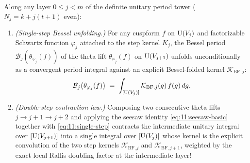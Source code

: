 \begin{proposition}
\label{prop:11:double-step}
Along any layer $0 \le j < m$ of the definite unitary period tower ($N_j = k + j(t+1)$ even):
\begin{enumerate}[label=\textup{(\roman*)}]
\item \emph{(Single-step Bessel unfolding.)} For any cuspform $f$ on $\mathrm{U}(V_j)$ and factorizable Schwartz function $\varphi_j$ attached to the step kernel $K_j$, the Bessel period $\mathcal{B}_j(\theta_{\varphi_j}(f))$ of the theta lift $\theta_{\varphi_j}(f)$ on $\mathrm{U}(V_{j+1})$ unfolds unconditionally as a convergent period integral against an explicit Bessel-folded kernel $\mathcal{K}_{\mathrm{BF}, j}$:
  \begin{equation}
  \label{eq:11:single-step}
    \mathcal{B}_j\bigl(\theta_{\varphi_j}(f)\bigr) \;=\; \int_{[\mathrm{U}(V_j)]} \mathcal{K}_{\mathrm{BF}, j}(g)\, f(g)\, dg.
  \end{equation}
\item \emph{(Double-step contraction law.)} Composing two consecutive theta lifts $j \to j + 1 \to j + 2$ and applying the seesaw identity \eqref{eq:11:seesaw-basic} together with \eqref{eq:11:single-step} contracts the intermediate unitary integral over $[\mathrm{U}(V_{j+1})]$ into a single integral over $[\mathrm{U}(V_j)]$ whose kernel is the explicit convolution of the two step kernels $\mathcal{K}_{\mathrm{BF}, j}$ and $\mathcal{K}_{\mathrm{BF}, j+1}$, weighted by the exact local Rallis doubling factor at the intermediate layer!
\end{enumerate}
\end{proposition}

